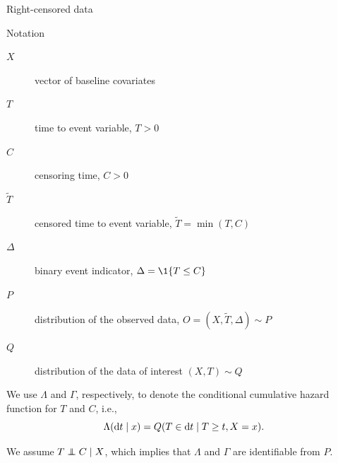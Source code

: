 \documentclass[smaller]{beamer}\usepackage{listings}
\begin{document}
\begin{frame}[label={sec:org0a7c9cf}]{Right-censored data}
\small

\begin{block}{Notation}
\begin{description}
\item[{\(X\)}] vector of baseline covariates
\item[{\(T\)}] time to event variable, \(T > 0\)
\item[{\(C\)}] censoring time, \(C > 0\)
\item[{\color{gray}\(\tilde T\)\color{black}}] censored time to event variable, \(\tilde T = \min(T, C)\)
\item[{\color{gray}\(\Delta\)\color{black}}] binary event indicator, \(\Delta =
  \1{\{T \leq C\}}\)
\item[{\color{gray}\(P\)\color{black}}] distribution of the observed data, \(O =
  (X, \tilde T, \Delta) \sim P\)
\item[{\(Q\)}] distribution of the data of interest \((X, T) \sim Q\)
\end{description}

\hfill

We use \color{bblue} \(\Lambda\) \color{black} and
\color{bblue}\(\Gamma\)\color{black}, respectively, to denote the conditional
cumulative hazard function for \(T\) and \(C\), i.e.,
\begin{equation*}
  \Lambda(\mathop{}\!\mathrm{d} t \mid x) = Q(T \in \mathop{}\!\mathrm{d} t \mid T \geq t, X=x).
\end{equation*}

We assume \(T \independent C \mid X\), which implies that \(\Lambda\) and
\(\Gamma\) are identifiable from \(P\).
\end{block}
\end{frame}
\end{document}
